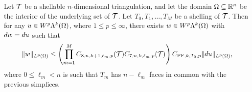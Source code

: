 \documentclass[10pt,a4paper]{article}
\begin{document}
\color{red}
\begin{theorem}\label{theorem:poincarefriedrichsestimate:exterior:contraction}
    Let ${\mathcal T}$ be a shellable $n$-dimensional triangulation, and let the domain $\Omega \subseteq {\mathbb R}^{n}$ be the interior of the underlying set of ${\mathcal T}$.
    Let $T_0, T_1, \dots, T_M$ be a shelling of ${\mathcal T}$.
    Then for any $u \in W^{p}\Lambda^{k}(\Omega)$, where $1 \leq p \leq \infty$, 
    there exists $w \in W^{p}\Lambda^{k}(\Omega)$ with $d w = d u$ 
    such that 
    \begin{align*}
        \| w \|_{L^{p}(\Omega)}
        \leq 
        \left( 
        \prod_{m=1}^{M}
            C_{8,n,k+1,\ell_{m},p}({\mathcal T})
            C_{7,n,k  ,\ell_{m},p}({\mathcal T})
        \right)
        C_{{{\rm PF}},k,T_{0},p}
        \| d u \|_{L^{p}(\Omega)}
        ,
    \end{align*}
    where $0 \leq \ell_{m} < n$ is such that $T_{m}$ has $n - \ell_{m}$ faces in common with the previous simplices.
\end{theorem}
\end{document}
